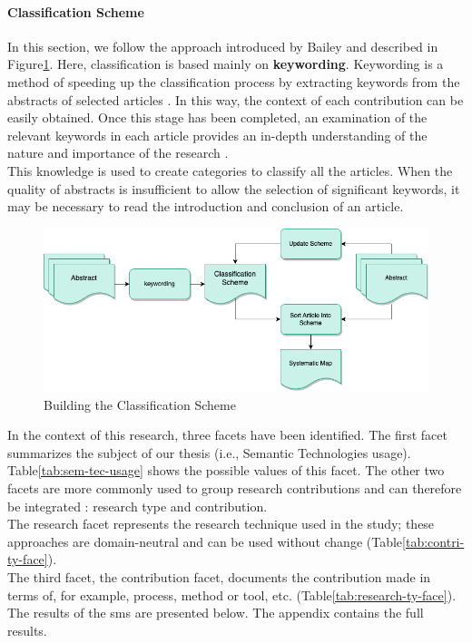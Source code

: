             
            \paragraph{Classification Scheme}
            In this section, we follow the approach introduced by Bailey \cite{hill2019systematic} and described in Figure\ref{fig:BuildClassSchem}. Here, classification is based mainly on \textbf{keywording}. Keywording is a method of speeding up the classification process by extracting keywords from the abstracts of selected articles \cite{petersen2008systematic}. In this way, the context of each contribution can be easily obtained. Once this stage has been completed, an examination of the relevant keywords in each article provides an in-depth understanding of the nature and importance of the research \cite{petersen2008systematic}. \\
            This knowledge is used to create categories to classify all the articles. When the quality of abstracts is insufficient to allow the selection of significant keywords, it may be necessary to read the introduction and conclusion of an article.

            \begin{figure}[h]
                \centering
                \includegraphics[scale=0.6]{images/RelatedWork-Build-Class-Schem.drawio.png}  \caption{\label{fig:BuildClassSchem}  Building the Classification Scheme \cite{petersen2008systematic}}
            \end{figure}

           In the context of this research, three facets have been identified. The first facet summarizes the subject of our thesis (i.e., Semantic Technologies usage). Table\ref{tab:sem-tec-usage} shows the possible values of this facet. The other two facets are more commonly used to group research contributions and can therefore be integrated \cite{petersen2008systematic, wieringa2006requirements}: research type and contribution.\\
            The research facet represents the research technique used in the study; these approaches are domain-neutral and can be used without change (Table\ref{tab:contri-ty-face}).\\
            The third facet, the contribution facet, documents the contribution made in terms of, for example, process, method or tool, etc. (Table\ref{tab:research-ty-face}).\\
            The results of the \acrshort{sms} are presented below. The appendix contains the full results.

